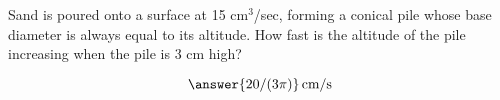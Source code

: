 \documentclass{ximera}
\author{Bart Snapp}
\begin{document}
\begin{exercise}

Sand is poured onto a surface at 15 cm${}^3$/sec, forming a conical
pile whose base diameter is always equal to its altitude.  How fast is
the altitude of the pile increasing when the pile is 3 cm high?
\begin{prompt}
  \[
  \answer{20/(3\pi)}\,\text{cm/s}
  \]
\end{prompt}
\end{exercise}
\end{document}
